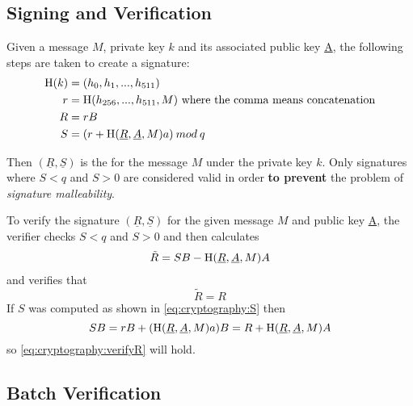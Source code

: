 \subsection{Signing and Verification}

Given a message $M$, private key $k$ and its associated public key \underline{A}, the following steps are taken to create a signature:
\begin{align}
\operatorname{H}(k) &=(h_0, h_1,..., h_{511}) \\
r &= \operatorname{H}(h_{256},...,h_{511}, M) \text{ where the comma means concatenation} \\
R &= rB \\
S &= (r + \operatorname{H}(\underline{R}, \underline{A}, M)a) \: mod \: q \label{eq:cryptography:S}
\end{align}

Then $(\underline{R}, \underline{S})$ is the  for the message $M$ under the private key $k$.
Only signatures where $S<q$ and $S>0$ are considered valid in order \textbf{to prevent} the problem of \emph{signature malleability}.

To verify the signature $(\underline{R}, \underline{S})$ for the given message $M$ and public key \underline{A}, the verifier checks $S<q$ and $S>0$ and then calculates
\begin{align*}
\tilde{R} = SB - \operatorname{H}(\underline{R}, \underline{A}, M)A
\end{align*}
and verifies that
\begin{equation}
\tilde{R} = R \label{eq:cryptography:verifyR}
\end{equation}
If $S$ was computed as shown in \eqref{eq:cryptography:S} then
$$SB = rB + (\operatorname{H}(\underline{R}, \underline{A}, M)a)B = R + \operatorname{H}(\underline{R}, \underline{A}, M)A$$
so \eqref{eq:cryptography:verifyR} will hold.

\subsection{Batch Verification}

